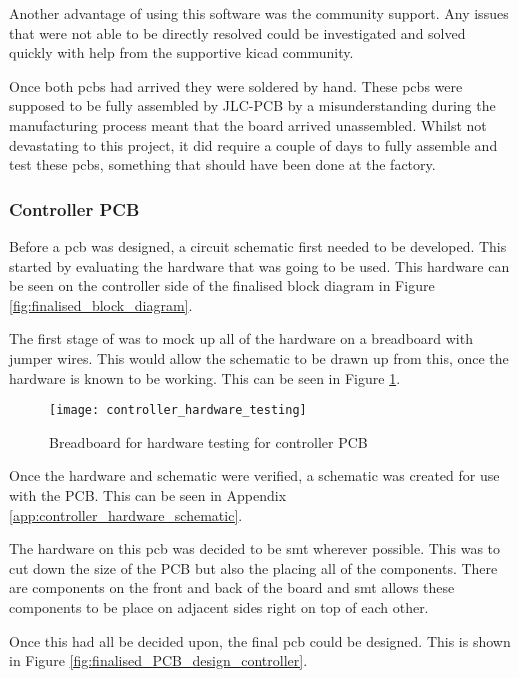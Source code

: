 \documentclass [11pt]{article}
\begin{document}
Another advantage of using this software was the community support. Any issues that were not able to be directly resolved could be investigated and solved quickly with help from the supportive \gls{kicad} community. 

Once both \gls{pcb}s had arrived they were soldered by hand. These \gls{pcb}s were supposed to be fully assembled by JLC-PCB by a misunderstanding during the manufacturing process meant that the board arrived unassembled. Whilst not devastating to this project, it did require a couple of days to fully assemble and test these \gls{pcb}s, something that should have been done at the factory.   


\subsubsection{Controller PCB}

Before a \gls{pcb} was designed, a circuit schematic first needed to be developed. This started by evaluating the hardware that was going to be used. This hardware can be seen on the controller side of the finalised block diagram in Figure \ref{fig:finalised_block_diagram}.

The first stage of was to mock up all of the hardware on a breadboard with jumper wires. This would allow the schematic to be drawn up from this, once the hardware is known to be working. This can be seen in Figure \ref{fig:controller_hardware_testing}.

\begin{figure}[H]
\centerline{\texttt{[image: controller\_hardware\_testing]}}
\caption{Breadboard for hardware testing for controller PCB}
\label{fig:controller_hardware_testing}
\end{figure}

Once the hardware and schematic were verified, a schematic was created for use with the PCB. This can be seen in Appendix \ref{app:controller_hardware_schematic}.

The hardware on this \gls{pcb} was decided to be \gls{smt} wherever possible. This was to cut down the size of the PCB but also the placing all of the components. There are components on the front and back of the board and \gls{smt} allows these components to be place on adjacent sides right on top of each other. 

Once this had all be decided upon, the final \gls{pcb} could be designed. This is shown in Figure \ref{fig:finalised_PCB_design_controller}.
\end{document}
